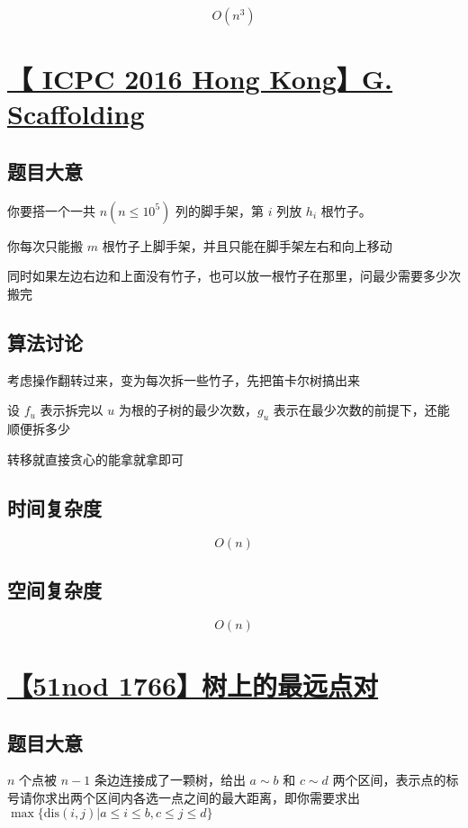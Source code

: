 \documentclass[UTF8]{article}
\begin{document}
$$
O(n^3)
$$

\section{\href{https://vjudge.net/problem/Kattis-scaffolding}{【 ICPC 2016 Hong Kong】G. Scaffolding}}

\subsection{题目大意}

你要搭一个一共 $n(n \le 10^5)$ 列的脚手架，第 $i$ 列放 $h_i$ 根竹子。

你每次只能搬 $m$ 根竹子上脚手架，并且只能在脚手架左右和向上移动

同时如果左边右边和上面没有竹子，也可以放一根竹子在那里，问最少需要多少次搬完

\subsection{算法讨论}

考虑操作翻转过来，变为每次拆一些竹子，先把笛卡尔树搞出来

设 $f_u$ 表示拆完以 $u$ 为根的子树的最少次数，$g_u$ 表示在最少次数的前提下，还能顺便拆多少

转移就直接贪心的能拿就拿即可

\subsection{时间复杂度}

$$
O(n)
$$

\subsection{空间复杂度}

$$
O(n)
$$

\section{\href{http://www.51nod.com/Challenge/Problem.html?problemId=1766}{【51nod 1766】树上的最远点对}}

\subsection{题目大意}

$n$ 个点被 $n-1$ 条边连接成了一颗树，给出 $a \sim b$ 和 $c \sim d$ 两个区间，表示点的标号请你求出两个区间内各选一点之间的最大距离，即你需要求出 $\max\{\text{dis}(i,j) |a \le i \le b, c \le j \le d\}$
\end{document}
